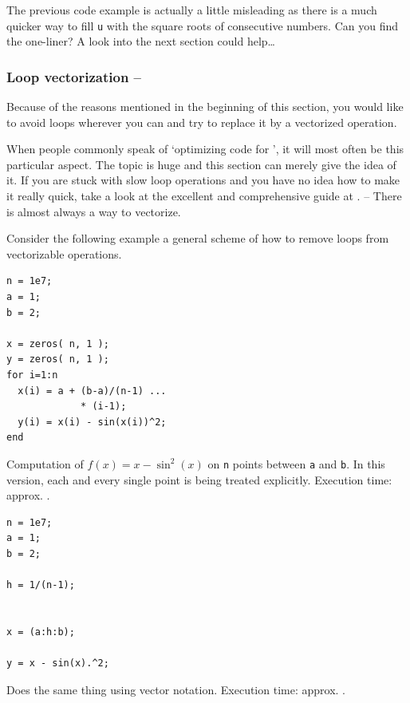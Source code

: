 \begin{remark}
The previous code example is actually a little misleading as there is a much
quicker way to fill \lstinline!u! with the square roots of consecutive numbers.
Can you find the one-liner? A look into the next section could help\dots
\end{remark}


\subsubsection{Loop vectorization -- \fastsymbol\fastsymbol\fastsymbol\fastsymbol\fastsymbol}

Because of the reasons mentioned in the beginning of this section, you would
like to avoid loops wherever you can and try to replace it by a vectorized
operation.

When people commonly speak of `optimizing code for \matlab{}', it will most
often be this particular aspect. The topic is huge and this section can merely
give the idea of it. If you are stuck with slow loop operations and you have
no idea how to make it really quick, take a look at the excellent and
comprehensive guide at \cite{Mathworks:2009:CVG}. -- There is almost always a
way to vectorize.

Consider the following example a general scheme of how to remove loops from
vectorizable operations.

\hfill
\begin{minipage}[t]{.45\textwidth}
\begin{lstlisting}[framerule=2pt,rulecolor=\color{badred}]
n = 1e7;
a = 1;
b = 2;

x = zeros( n, 1 );
y = zeros( n, 1 );
for i=1:n
  x(i) = a + (b-a)/(n-1) ...
             * (i-1);
  y(i) = x(i) - sin(x(i))^2;
end
\end{lstlisting}
Computation of $f(x)=x-\sin^2(x)$ on \lstinline!n! points between \lstinline!a!
and \lstinline!b!. In this version, each and every single point is being
treated explicitly. Execution time: approx. .
\end{minipage}
\hfill
\begin{minipage}[t]{.45\textwidth}
\begin{lstlisting}[framerule=2pt,rulecolor=\color{goodgreen}]
n = 1e7;
a = 1;
b = 2;

h = 1/(n-1);


x = (a:h:b);

y = x - sin(x).^2;

\end{lstlisting}
Does the same thing using vector notation. Execution time: approx. .
\end{minipage}
\hfill

